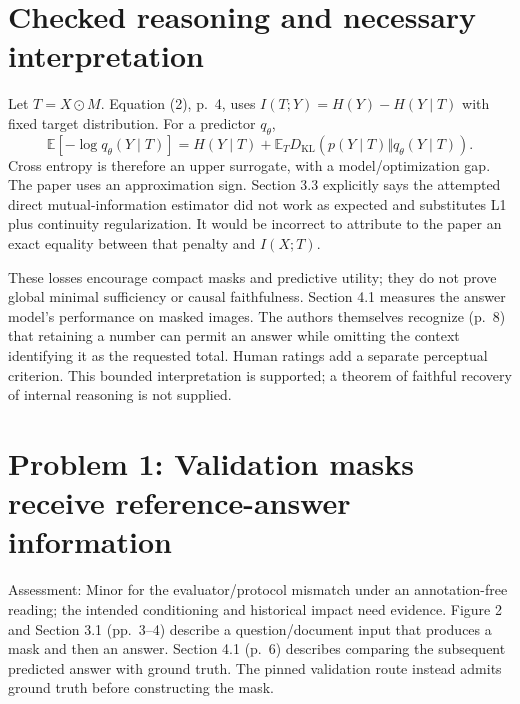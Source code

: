 \documentclass[10pt]{article}
\begin{document}
\section*{Checked reasoning and necessary interpretation}
Let \(T=X\odot M\). Equation (2), p. 4, uses \(I(T;Y)=H(Y)-H(Y\mid T)\) with fixed target distribution. For a predictor \(q_\theta\), \[\mathbb E[-\log q_\theta(Y\mid T)]
 =H(Y\mid T)+\mathbb E_T D_{\mathrm{KL}}(p(Y\mid T)\Vert q_\theta(Y\mid T)).\] Cross entropy is therefore an upper surrogate, with a model/optimization gap. The paper uses an approximation sign. Section 3.3 explicitly says the attempted direct mutual-information estimator did not work as expected and substitutes L1 plus continuity regularization. It would be incorrect to attribute to the paper an exact equality between that penalty and \(I(X;T)\).\par
These losses encourage compact masks and predictive utility; they do not prove global minimal sufficiency or causal faithfulness. Section 4.1 measures the answer model’s performance on masked images. The authors themselves recognize (p. 8) that retaining a number can permit an answer while omitting the context identifying it as the requested total. Human ratings add a separate perceptual criterion. This bounded interpretation is supported; a theorem of faithful recovery of internal reasoning is not supplied.\par
\section*{Problem 1: Validation masks receive reference-answer information}
Assessment: Minor for the evaluator/protocol mismatch under an annotation-free reading; the intended conditioning and historical impact need evidence. Figure 2 and Section 3.1 (pp. 3–4) describe a question/document input that produces a mask and then an answer. Section 4.1 (p. 6) describes comparing the subsequent predicted answer with ground truth. The pinned validation route instead admits ground truth before constructing the mask.\par
\end{document}
